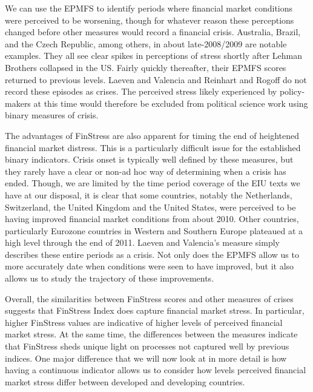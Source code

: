 \documentclass[]{article}
\begin{document}
We can use the EPMFS to identify periods where financial market
conditions were perceived to be worsening, though for whatever reason these perceptions changed before other measures would record a financial crisis. Australia, Brazil, and the Czech Republic, among others, in about late-2008/2009 are notable examples. They all see clear spikes in perceptions of stress shortly after Lehman Brothers collapsed in the US. Fairly quickly thereafter, their EPMFS scores returned to previous levels. Laeven and Valencia and Reinhart and Rogoff do not record these episodes as crises. The perceived stress likely experienced by policy-makers at this time would therefore be excluded from political science work using binary measures of crisis.

The advantages of FinStress are also apparent for timing the end of heightened financial market distress. This is a particularly difficult issue for the established binary indicators. Crisis onset is typically well defined by these measures, but they rarely have a clear or non-ad hoc way of determining when a crisis has ended. Though, we are limited by the time period coverage of the EIU texts we have at our disposal, it is clear that some countries, notably the Netherlands, Switzerland, the United Kingdom and the United States, were perceived to be having improved financial market conditions from about 2010. Other countries, particularly Eurozone countries in Western and Southern Europe plateaued at a high level through the end of 2011. Laeven and Valencia's measure simply describes these entire periods as a crisis. Not only does the EPMFS allow us to more accurately date when conditions were seen to have improved, but it also allows us to study the trajectory of these improvements.

Overall, the similarities between FinStress scores and other measures of crises suggests that FinStress Index does capture financial market stress. In particular, higher FinStress values are indicative of higher levels of perceived financial market stress. At the same time, the differences between the measures indicate that FinStress sheds unique light on processes not captured well by previous indices. One major difference that we will now look at in more detail is how having a continuous indicator allows us to consider how levels perceived financial market stress differ between developed and developing countries.
\end{document}
